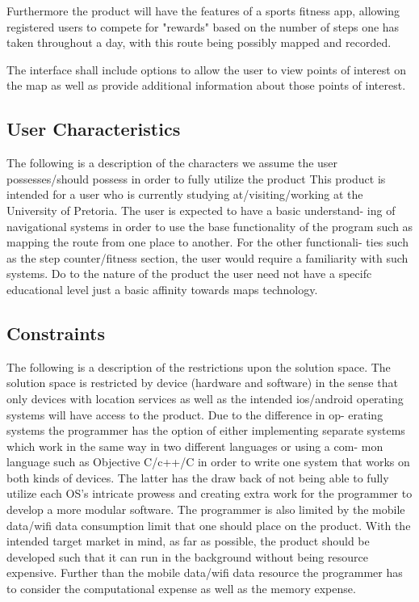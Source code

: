 \documentclass[12pt]{article}
\begin{document}
	

Furthermore the product will have the features of a sports fitness app, allowing registered users to compete for "rewards" based on the number of steps one has taken throughout a day, with this route being possibly mapped and recorded.

The interface shall include options to allow the user to view points of interest on the map as well as provide additional information about those points of interest.

\subsection{User Characteristics}
The following is a description of the characters we assume the user possesses/should
possess in order to fully utilize the product
This product is intended for a user who is currently studying at/visiting/working
at the University of Pretoria. The user is expected to have a basic understand-
ing of navigational systems in order to use the base functionality of the program
such as mapping the route from one place to another. For the other functionali-
ties such as the step counter/fitness section, the user would require a familiarity
with such systems. Do to the nature of the product the user need not have a
specifc educational level just a basic affinity towards maps technology.

\subsection{Constraints}
The following is a description of the restrictions upon the solution space.
The solution space is restricted by device (hardware and software) in the
sense that only devices with location services as well as the intended ios/android
operating systems will have access to the product. Due to the difference in op-
erating systems the programmer has the option of either implementing separate
systems which work in the same way in two different languages or using a com-
mon language such as Objective C/c++/C in order to write one system that
works on both kinds of devices. The latter has the draw back of not being
able to fully utilize each OS's intricate prowess and creating extra work for the
programmer to develop a more modular software. The programmer is also limited by the mobile data/wifi data consumption limit that one should place on the product. With the intended target market in mind, as far as possible, the product should be developed such that it can run in the background without
being resource expensive. Further than the mobile data/wifi data resource the programmer has to consider the computational expense as well as the memory expense.
\end{document}
